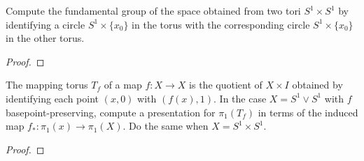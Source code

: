 \documentclass[12pt]{article}
\newenvironment{statement}[2][Statement]{\begin{trivlist}
\item[\hskip \labelsep {\bfseries #1}\hskip \labelsep {\bfseries #2.}]}{\end{trivlist}}
\begin{document}
\begin{statement}[Problem]{4}
  Compute the fundamental group of the space obtained from two tori $S^1 \times S^1$ by identifying a circle $S^1 \times \{x_0\}$ 
  in the torus with the corresponding circle $S^1 \times \{x_0\}$ in the other torus.
\end{statement}
\begin{proof}
  
\end{proof}

\begin{statement}[Problem]{5}
 The mapping torus $T_f$ of a map $f:X \to X$ is the quotient of $X \times I$ 
 obtained by identifying each point $(x,0)$ with $(f(x),1)$. In the case $X = S^1 \vee S^1$ with $f$ basepoint-preserving,
 compute a presentation for $\pi_1(T_f)$ in terms of the induced map $f_*: \pi_1(x) \to \pi_1(X)$. Do the same when $X = S^1 \times S^1$.
\end{statement}
\begin{proof}

\end{proof}
\end{document}
